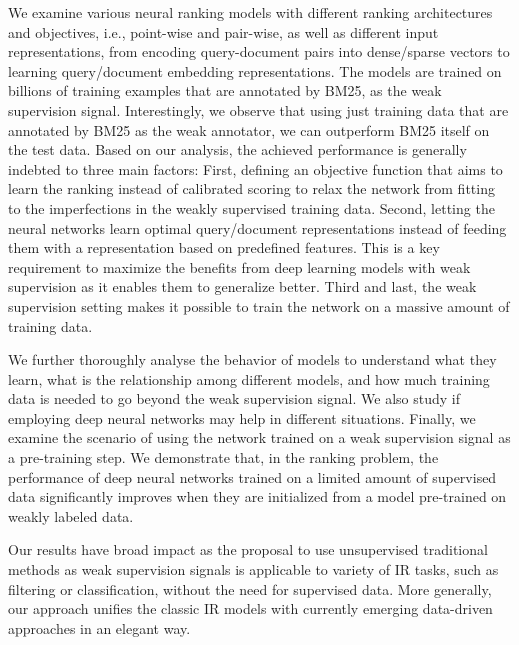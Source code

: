 \documentclass[sigconf]{acmart}
\newcommand{\shrink}{\vspace{-1.5ex}}
\def\:{\hskip0pt} \newcommand{\mypar}[1]{\vspace*{-0.1ex}\medskip\noindent\textbf{#1}~}
\begin{document}
We examine various neural ranking models with different ranking architectures and objectives, i.e., point-wise and pair-wise, as well as different input representations, from encoding query-document pairs into dense\:/\:sparse vectors to learning query\:/\:document embedding representations. 
The models are trained on billions of training examples that are annotated by BM25, as the weak supervision signal.
Interestingly, we observe that using just training data that are annotated by BM25 as the weak annotator, we can outperform BM25 itself on the test data.
Based on our analysis, the achieved performance is generally indebted to three main factors: 
First, defining an objective function that aims to learn the ranking instead of calibrated scoring to relax the network from fitting to the imperfections in the weakly supervised training data.
Second, letting the neural networks learn optimal query/document representations instead of feeding them with a representation based on predefined features. This is a key requirement to maximize the benefits from deep learning models with weak supervision as it enables them to generalize better.
Third and last, the weak supervision setting makes it possible to train the network on a massive amount of training data.


We further thoroughly analyse the behavior of models to understand what they learn, what is the relationship among different models, and how much training data is needed to go beyond the weak supervision signal. We also study if employing deep neural networks may help in different situations. 
Finally, we examine the scenario of using the network trained on a weak supervision signal as a pre-training step. We demonstrate that, in the ranking problem, the performance of deep neural networks trained on a limited amount of supervised data significantly improves when they are initialized from a model pre-trained on weakly labeled data.

Our results have broad impact as the proposal to use unsupervised traditional methods as weak supervision signals is applicable to variety of IR tasks, such as filtering or classification, without the need for supervised data. 
More generally, our approach unifies the classic IR models with currently emerging data-driven approaches in an elegant way.


\shrink
\end{document}
